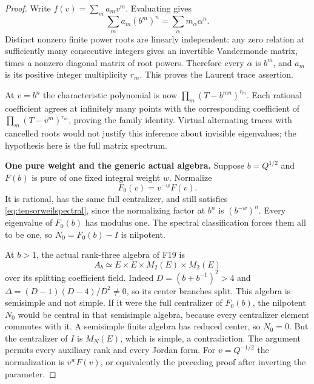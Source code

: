 \documentclass[11pt,a4paper]{article}
\newcommand{\fid}[1]{\textsf{#1}}\newcommand{\gate}[1]{\textsf{#1}}
\theoremstyle{named}\newtheorem{finding}{Finding}[section]
\theoremstyle{definition}\newtheorem{definition}[finding]{Definition}
\theoremstyle{remark}\newtheorem{remark}[finding]{Remark}
\begin{document}
\begin{proof}
Write $f(v)=\sum_m a_m v^m$. Evaluating gives
\[
 \sum_m a_m(b^m)^n=\sum_\alpha m_\alpha\alpha^n.
\]
Distinct nonzero finite power roots are linearly
independent: any zero relation at sufficiently many
consecutive integers gives an invertible Vandermonde
matrix, times a nonzero diagonal matrix of root powers.
Therefore every $\alpha$ is $b^m$, and $a_m$ is its
positive integer multiplicity $r_m$.
This proves the Laurent trace assertion.

At $v=b^n$ the characteristic polynomial is now
$\prod_m(T-b^{mn})^{r_m}$.
Each rational coefficient agrees at infinitely many
points with the corresponding coefficient of
$\prod_m(T-v^m)^{r_m}$, proving the family identity.
Virtual alternating traces with cancelled roots would
not justify this inference about invisible eigenvalues;
the hypothesis here is the full matrix spectrum.

\par\smallskip\noindent\textbf{One pure weight and the generic actual algebra.}\quad
Suppose $b=Q^{1/2}$ and $F(b)$ is pure of one fixed
integral weight $w$. Normalize
\[
 F_0(v)=v^{-w}F(v).
\]
It is rational, has the same full centralizer, and still
satisfies \eqref{eq:tensorweilspectral}, since the
normalizing factor at $b^n$ is $(b^{-w})^n$.
Every eigenvalue of $F_0(b)$ has modulus one.
The spectral classification forces them all to be one,
so $N_0=F_0(b)-I$ is nilpotent.

At $b>1$, the actual rank-three algebra of \fid{F19} is
\[
 A_b\simeq E\times E\times M_2(E)\times M_2(E)
\]
over its splitting coefficient field.
Indeed $D=(b+b^{-1})^2>4$ and
$\Delta=(D-1)(D-4)/D^2\ne0$, so its center branches split.
This algebra is semisimple and not simple.
If it were the full centralizer of $F_0(b)$, the
nilpotent $N_0$ would be central in that semisimple algebra,
because every centralizer element commutes with it.
A semisimple finite algebra has reduced center, so
$N_0=0$. But the centralizer of $I$ is $M_N(E)$,
which is simple, a contradiction.
The argument permits every auxiliary rank and every
Jordan form. For $v=Q^{-1/2}$ the normalization is
$v^wF(v)$, or equivalently the preceding proof after
inverting the parameter.


\end{proof}
\end{document}
